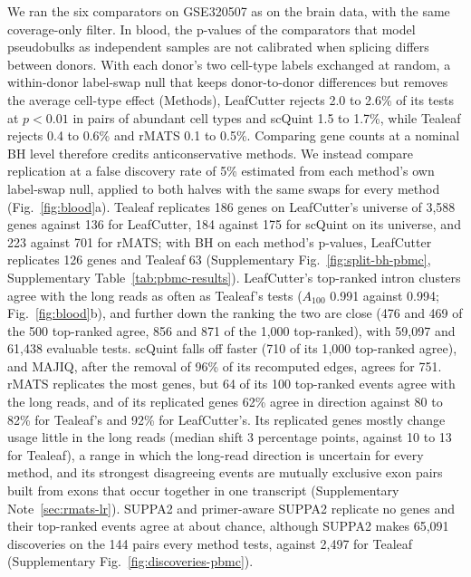 \documentclass[11pt]{article}
\begin{document}
We ran the six comparators on GSE320507 as on the brain data, with the same coverage-only filter. In blood, the p-values of the comparators that model pseudobulks as independent samples are not calibrated when splicing differs between donors. With each donor's two cell-type labels exchanged at random, a within-donor label-swap null that keeps donor-to-donor differences but removes the average cell-type effect (Methods), LeafCutter rejects 2.0 to 2.6\% of its tests at $p<0.01$ in pairs of abundant cell types and scQuint 1.5 to 1.7\%, while Tealeaf rejects 0.4 to 0.6\% and rMATS 0.1 to 0.5\%. Comparing gene counts at a nominal BH level therefore credits anticonservative methods. We instead compare replication at a false discovery rate of 5\% estimated from each method's own label-swap null, applied to both halves with the same swaps for every method (Fig.~\ref{fig:blood}a). Tealeaf replicates 186 genes on LeafCutter's universe of 3{,}588 genes against 136 for LeafCutter, 184 against 175 for scQuint on its universe, and 223 against 701 for rMATS; with BH on each method's p-values, LeafCutter replicates 126 genes and Tealeaf 63 (Supplementary Fig.~\ref{fig:split-bh-pbmc}, Supplementary Table~\ref{tab:pbmc-results}). LeafCutter's top-ranked intron clusters agree with the long reads as often as Tealeaf's tests ($A_{100}$ 0.991 against 0.994; Fig.~\ref{fig:blood}b), and further down the ranking the two are close (476 and 469 of the 500 top-ranked agree, 856 and 871 of the 1{,}000 top-ranked), with 59{,}097 and 61{,}438 evaluable tests. scQuint falls off faster (710 of its 1{,}000 top-ranked agree), and MAJIQ, after the removal of 96\% of its recomputed edges, agrees for 751. rMATS replicates the most genes, but 64 of its 100 top-ranked events agree with the long reads, and of its replicated genes 62\% agree in direction against 80 to 82\% for Tealeaf's and 92\% for LeafCutter's. Its replicated genes mostly change usage little in the long reads (median shift 3 percentage points, against 10 to 13 for Tealeaf), a range in which the long-read direction is uncertain for every method, and its strongest disagreeing events are mutually exclusive exon pairs built from exons that occur together in one transcript (Supplementary Note~\ref{sec:rmats-lr}). SUPPA2 and primer-aware SUPPA2 replicate no genes and their top-ranked events agree at about chance, although SUPPA2 makes 65{,}091 discoveries on the 144 pairs every method tests, against 2{,}497 for Tealeaf (Supplementary Fig.~\ref{fig:discoveries-pbmc}).
\end{document}
